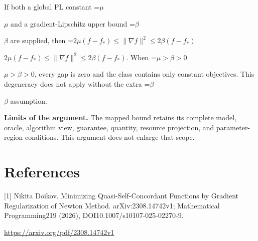 \documentclass[10pt,a4paper]{article}
\newcommand{\AtlasMath}[1]{\par\begingroup\centering\setbox0=\hbox{$\displaystyle #1$}\ifdim\wd0>1.4\linewidth\typeout{ATLAS WIDE FORMULA: \the\wd0}\fi\ifdim\wd0>\linewidth\resizebox{\linewidth}{!}{\box0}\else\box0\fi\par\endgroup}
\newcommand{\AtlasInlineMath}[1]{\begingroup\setbox0=\hbox{$#1$}\ifdim\wd0>.4\linewidth\endgroup\AtlasMath{#1}\else\endgroup$#1$\fi}
\begin{document}
If both a global PL constant \AtlasInlineMath{\mu} and a gradient-Lipschitz upper bound \AtlasInlineMath{\beta} are supplied, then \AtlasInlineMath{2\mu(f-f_*)\le\|\nabla f\|^2\le2\beta(f-f_*)}. When \AtlasInlineMath{\mu>\beta>0}, every gap is zero and the class contains only constant objectives. This degeneracy does not apply without the extra \AtlasInlineMath{\beta} assumption.

\textbf{Limits of the argument.} The mapped bound retains its complete model, oracle, algorithm view, guarantee, quantity, resource projection, and parameter-region conditions. This argument does not enlarge that scope.

\section{References}
[1] Nikita Doikov. Minimizing Quasi-Self-Concordant Functions by Gradient Regularization of Newton Method. arXiv:2308.14742v1; Mathematical Programming219 (2026), DOI10.1007/s10107-025-02270-9.

\url{https://arxiv.org/pdf/2308.14742v1}
\end{document}
